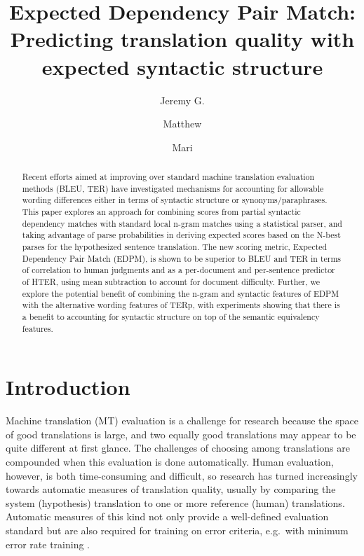 \documentclass{kluwer}    %
\begin{document}
\begin{article}
\begin{opening}         
\title{Expected Dependency Pair Match:\\
Predicting translation quality with expected syntactic structure} 
\author{Jeremy G. }  
\author{Matthew }
\author{Mari }  

\begin{abstract}
  Recent efforts aimed at improving over standard machine translation
  evaluation methods (BLEU, TER) have investigated mechanisms for
  accounting for allowable wording differences either in terms of
  syntactic structure or synonyms/paraphrases. This paper explores an
  approach for combining scores from partial syntactic dependency
  matches with standard local n-gram matches using a statistical
  parser, and taking advantage of parse probabilities in deriving
  expected scores based on the N-best parses for the hypothesized
  sentence translation.  The new scoring metric, Expected Dependency
  Pair Match (EDPM), is shown to be superior to BLEU and TER in terms
  of correlation to human judgments and as a per-document and
  per-sentence predictor of HTER, using mean subtraction to account
  for document difficulty. Further, we explore the potential benefit
  of combining the n-gram and syntactic features of EDPM with the
  alternative wording features of TERp, with experiments showing that
  there is a benefit to accounting for syntactic structure on top of
  the semantic equivalency features.
\end{abstract}

\end{opening}           

\section{Introduction}
\label{sec:intro}

Machine translation (MT) evaluation is a challenge for research
because the space of good translations is large, and two equally good
translations may appear to be quite different at first glance. 
%
The challenges of choosing among translations are compounded when this
evaluation is done automatically.
%
Human evaluation, however, is both time-consuming and difficult, so
research has turned increasingly towards automatic measures of
translation quality, usually by comparing the system (hypothesis) translation to
one or more reference (human) translations.
%
Automatic measures of this kind not
only provide a well-defined evaluation standard but are also required
for training on error criteria, e.g.\ with minimum error rate training
\cite{och03mert}.


\end{article}
\end{document}
